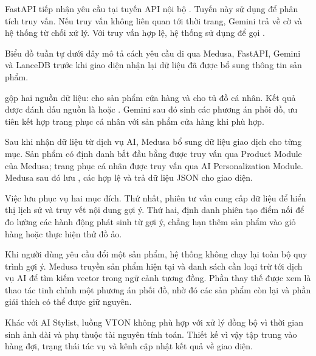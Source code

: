 \medskip

FastAPI tiếp nhận yêu cầu tại tuyến API nội bộ . Tuyến này sử dụng  để phân tích truy vấn. Nếu truy vấn không liên quan tới thời trang, Gemini trả về cờ  \code{=}  và hệ thống từ chối xử lý. Với truy vấn hợp lệ, hệ thống sử dụng  để gọi .

\medskip

Biểu đồ tuần tự dưới đây mô tả cách yêu cầu đi qua Medusa, FastAPI, Gemini và LanceDB trước khi giao diện nhận lại dữ liệu đã được bổ sung thông tin sản phẩm.



 gộp hai nguồn dữ liệu:  cho sản phẩm cửa hàng và  cho tủ đồ cá nhân. Kết quả được đánh dấu nguồn là  hoặc . Gemini sau đó sinh các phương án phối đồ, ưu tiên kết hợp trang phục cá nhân với sản phẩm cửa hàng khi phù hợp.

\medskip

Sau khi nhận dữ liệu từ dịch vụ AI, Medusa bổ sung dữ liệu giao dịch cho từng mục. Sản phẩm có định danh bắt đầu bằng  được truy vấn qua Product Module của Medusa; trang phục cá nhân được truy vấn qua AI Personalization Module. Medusa sau đó lưu , các  hợp lệ và trả dữ liệu JSON cho giao diện.

\medskip

Việc lưu  phục vụ hai mục đích. Thứ nhất, phiên tư vấn cung cấp dữ liệu để hiển thị lịch sử và truy vết nội dung gợi ý. Thứ hai, định danh phiên tạo điểm nối để đo lường các hành động phát sinh từ gợi ý, chẳng hạn thêm sản phẩm vào giỏ hàng hoặc thực hiện thử đồ ảo.

\medskip

Khi người dùng yêu cầu đổi một sản phẩm, hệ thống không chạy lại toàn bộ quy trình gợi ý. Medusa truyền sản phẩm hiện tại và danh sách cần loại trừ tới dịch vụ AI để tìm kiếm vector trong ngữ cảnh tương đồng. Phần thay thế được xem là thao tác tinh chỉnh một phương án phối đồ, nhờ đó các sản phẩm còn lại và phần giải thích có thể được giữ nguyên.

\medskip

Khác với AI Stylist, luồng VTON không phù hợp với xử lý đồng bộ vì thời gian sinh ảnh dài và phụ thuộc tài nguyên tính toán. Thiết kế vì vậy tập trung vào hàng đợi, trạng thái tác vụ và kênh cập nhật kết quả về giao diện.

